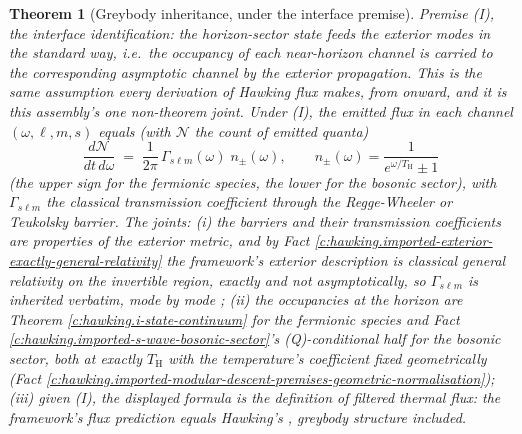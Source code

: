 \documentclass[11pt]{article}
\newtheorem{theorem}{Theorem}[section]
\theoremstyle{definition}
\theoremstyle{plain}
\newcommand{\changedmark}[2]{\marginpar{\raggedright\scriptsize\color{#1}#2}}
\providecommand{\TH}{}\renewcommand{\TH}{T_{\mathrm{H}}}
\begin{document}
\begin{theorem}[Greybody inheritance, under the interface premise]\label{c:hawking.greybody-inheritance-under-interface-premise}
\changedmark{gray}{reworded}
\emph{Premise (I), the interface identification:} the horizon-sector state feeds the exterior modes in the standard way, i.e.\ the occupancy of each near-horizon channel is carried to the corresponding asymptotic channel by the exterior propagation. This is the same assumption every derivation of Hawking flux makes, from \cite{Hawking1975} onward, and it is this assembly's one non-theorem joint. Under (I), the emitted flux in each channel $(\omega, \ell, m, s)$ equals (with $\mathcal{N}$ the count of emitted quanta)
\[
\frac{d\mathcal{N}}{dt\,d\omega} \;=\; \frac{1}{2\pi}\,\Gamma_{s\ell m}(\omega)\; n_\pm(\omega), \qquad
n_\pm(\omega) = \frac{1}{e^{\omega/\TH} \pm 1}
\]
(the upper sign for the fermionic species, the lower for the bosonic sector), with $\Gamma_{s\ell m}$ the classical transmission coefficient through the Regge-Wheeler or Teukolsky barrier. The joints: (i) the barriers and their transmission coefficients are properties of the exterior metric, and by Fact \ref{c:hawking.imported-exterior-exactly-general-relativity} the framework's exterior description \emph{is} classical general relativity on the invertible region, exactly and not asymptotically, so $\Gamma_{s\ell m}$ is inherited verbatim, mode by mode \cite{ReggeWheeler1957, Teukolsky1973}; (ii) the occupancies at the horizon are Theorem \ref{c:hawking.i-state-continuum} for the fermionic species and Fact \ref{c:hawking.imported-s-wave-bosonic-sector}'s (Q)-conditional half for the bosonic sector, both at exactly $\TH$ with the temperature's coefficient fixed geometrically (Fact \ref{c:hawking.imported-modular-descent-premises-geometric-normalisation}); (iii) given (I), the displayed formula is the definition of filtered thermal flux: the framework's flux prediction equals Hawking's \cite{Hawking1975, Page1976}, greybody structure included.
\end{theorem}
\end{document}
